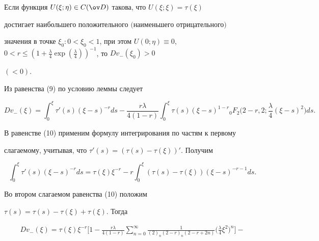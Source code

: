  


\begin{lem} 


Если функция $U(\xi;\eta)\in C(\ov D)$ такова, что $U(\xi;\xi)=\tau(\xi)$ 


достигает наибольшего положительного $($наименьшего отрицательного$)$ 


значения в точке $\xi_0:0<\xi_0<1$, при этом $U(0;\eta)\equiv0$, $0< 


r\le(1+\frac{\lambda}{4}\exp(\frac{\lambda}{4}))^{-1}$, то $D v_-(\xi_0)>0$ 


$(<0)$. 


\end{lem} 


 


\begin{pf} 


Из равенства (9) по условию леммы следует 


\begin{equation} 


D v_-(\xi)=\int^\xi_0 \tau'(s)(\xi-s)^{-r}ds- 


\frac{r\lambda}{4(1-r)}\int^\xi_0 \tau(s)(\xi-s)^{1-r} 


{}_0F_2\bigg(2-r,2;\frac{\lambda}{4}(\xi-s)^2 \bigg)ds. 


\end{equation} 


В равенстве (10) применим формулу интегрирования по частям к первому 


слагаемому, учитывая, что $\tau'(s)=(\tau(s)-\tau(\xi))'$. Получим 


$$ 


\int^\xi_0 \tau'(s)(\xi-s)^{-r}ds=\tau(\xi)\xi^{-r}-r 


\int^\xi_0 (\tau(s)-\tau(\xi))(\xi-s)^{-r-1}ds. 


$$ 


Во втором слагаемом равенства (10) положим 


$\tau(s)=\tau(s)-\tau(\xi)+\tau(\xi)$. Тогда 


\begin{multline*} 


D v_-(\xi)=\tau(\xi)\xi^{-r}\bigg[1-\frac{r\lambda}{4(1-r)} 


\sum^\infty_{n=0}\frac{1}{(2)_n(2-r)_n(2-r+2n)} 


\bigg(\frac{\lambda}{4}\xi^2\bigg)^n\bigg]- \\ 


% 



\end{multline*}
\end{pf}
